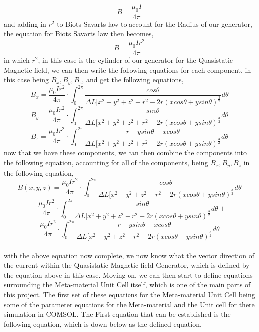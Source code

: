 \documentclass[]{article}
\begin{document}
\begin{equation}
B = \frac{\mu_0I}{4\pi}
\end{equation}
and adding in $r^2$ to Biots Savarts law to account for the Radius of our generator, the equation for Biots Savarts law then becomes,
\begin{equation}
B = \frac{\mu_0Ir^2}{4\pi}
\end{equation}
in which $r^2$, in this case is the cylinder of our generator for the Quasistatic Magnetic field, we can then write the following equations for each component, in this case being $B_x,B_y,B_z$, and get the following equations,
\\
\begin{equation}
B_x = \frac{\mu_0Ir^2}{4\pi} \cdot \int_{0}^{2\pi} \frac{cos\theta}{\Delta{L}[x^2+y^2+z^2+r^2-2r(xcos\theta+ysin\theta)^\frac{3}{2}}d\theta
\end{equation}
\begin{equation}
B_y = \frac{\mu_0Ir^2}{4\pi} \cdot \int_{0}^{2\pi} \frac{sin\theta}{\Delta{L}[x^2+y^2+z^2+r^2-2r(xcos\theta+ysin\theta)^\frac{3}{2}}d\theta
\end{equation}
\begin{equation}
B_z = \frac{\mu_0Ir^2}{4\pi} \cdot \int_{0}^{2\pi} \frac{r-ysin\theta-xcos\theta}{\Delta{L}[x^2+y^2+z^2+r^2-2r(xcos\theta+ysin\theta)^\frac{3}{2}}d\theta
\end{equation}
now that we have these components, we can then combine the components into the following equation, accounting for all of the components, being $B_x, B_y, B_z$ in the following equation,
\\
\[B(x,y,z) = \frac{\mu_0Ir^2}{4\pi} \cdot \int_{0}^{2\pi} \frac{cos\theta}{\Delta{L}[x^2+y^2+z^2+r^2-2r(xcos\theta+ysin\theta)^\frac{3}{2}}d\theta\]
\[+ \frac{\mu_0Ir^2}{4\pi} \cdot \int_{0}^{2\pi} \frac{sin\theta}{\Delta{L}[x^2+y^2+z^2+r^2-2r(xcos\theta+ysin\theta)^\frac{3}{2}}d\theta +\]
\[\frac{\mu_0Ir^2}{4\pi} \cdot \int_{0}^{2\pi} \frac{r-ysin\theta-xcos\theta}{\Delta{L}[x^2+y^2+z^2+r^2-2r(xcos\theta+ysin\theta)^\frac{3}{2}}d\theta\]
\\
with the above equation now complete, we now know what the vector direction of the current within the Quasistatic Magnetic field Generator, which is defined by the equation above in this case. Moving on, we can then start to define equations surrounding the Meta-material Unit Cell itself, which is one of the main parts of this project. The first set of these equations for the Meta-material Unit Cell being some of the parameter equations for the Meta-material and the Unit cell for there simulation in COMSOL. The First equation that can be established is the following equation, which is down below as the defined equation,
\end{document}
